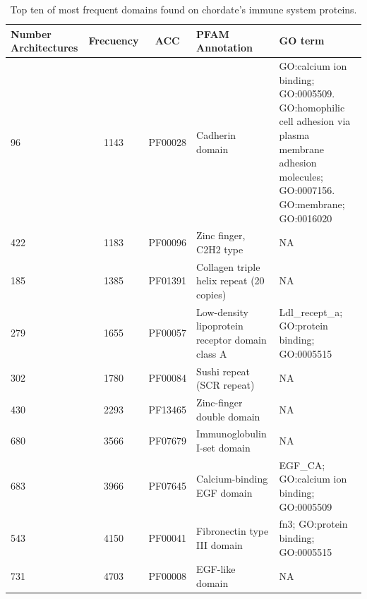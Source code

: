 \documentclass[11pt]{article}
\begin{document}

\begin{table}[ht!]
\caption{Top ten of most frequent domains found on chordate's immune system 
proteins.}
\begin{center}
\begin{tabular}{p{2.0cm}ccp{4cm}p{3.5cm}}
\toprule
\textbf{Number Architectures}& \textbf{Frecuency} & \textbf{ACC} & 
\textbf{PFAM Annotation} & \textbf{GO term}\\
\midrule
96&1143 & PF00028&Cadherin domain & GO:calcium ion binding; GO:0005509. 
GO:homophilic cell adhesion via plasma membrane adhesion molecules; GO:0007156. 
GO:membrane; GO:0016020\\
422&1183 & PF00096&Zinc finger, C2H2 type & NA \\
185&1385 &PF01391&Collagen triple helix repeat (20 copies) & NA \\
279&1655  &PF00057&Low-density lipoprotein receptor domain class A & 
Ldl\_recept\_a; GO:protein binding; GO:0005515 \\
302&1780 &PF00084&Sushi repeat (SCR repeat) & NA \\
430&2293 & PF13465&Zinc-finger double domain & NA\\
680&3566 &PF07679&Immunoglobulin I-set domain & NA\\
683&3966 &PF07645&Calcium-binding EGF domain & EGF\_CA; GO:calcium ion binding; 
GO:0005509\\
543&4150 &PF00041&Fibronectin type III domain & fn3; GO:protein binding; 
GO:0005515\\
731&4703 &PF00008&EGF-like domain & NA\\
\bottomrule
\end{tabular}
\end{center}
\label{tab:domains}
\end{table}%



\end{document}
